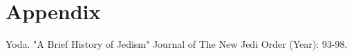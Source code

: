 \documentclass[11pt, spanish]{report}
\begin{document}

\tableofcontents
 
\newpage

\listoffigures
{} 


\listoftables 
{} 
\newpage



\newpage

\clearpage
%
%
%
%
%
%

\clearpage
\section*{Appendix}


\begin{thebibliography}{}
 Yoda. "A Brief History of Jedism" Journal of The New Jedi Order (Year): 93-98.
 \end{thebibliography} 
 
\end{document}
